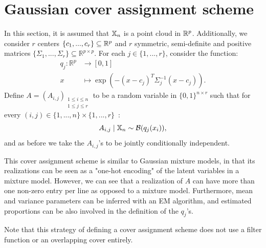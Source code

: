 \section{Gaussian cover assignment scheme}\label{apdx:gaussian}
In this section, it is assumed that  $\mathbb{X}_n$ is a point cloud in $\mathbb{R}^p$. Additionally, we consider $r$ centers $\{c_1,...,c_r\}\subseteq\mathbb{R}^p$ and $r$ symmetric, semi-definite and positive matrices $\{\Sigma_1,...,\Sigma_r\}\subseteq\mathbb{R}^{p\times p}$. For each $j\in\{1,...,r\}$, consider the function:
\begin{align*}
q_j\colon \mathbb{R}^p  &\longrightarrow [0,1]\\
x &\longmapsto \exp \left(-(x-c_j)^T  \Sigma_j^{-1} (x-c_j)\right).
\end{align*}
\noindent
Define $A=(A_{i,j})_{\substack{1\leq i\leq n \\ 1\leq j\leq r}}$ to be a random variable in $\{0,1\}^{n\times r}$ such that for every $(i,j)\in\{1,...,n\}\times\{1,...,r\}$~:
$$ A_{i,j}\mid \mathbb{X}_n\sim \mathcal{B}(q_j(x_i)),$$
and  as before we take the $ A_{i,j}$'s to be jointly conditionally independent.

This cover assignment scheme is similar to Gaussian mixture models, in that its realizations can be seen as a "one-hot encoding" of the latent variables in a mixture model. However, we can see that a realization of $A$ can have more than one non-zero entry per line as opposed to a mixture model. Furthermore, mean and variance parameters can be inferred with an EM algorithm, and estimated proportions can be also involved in the definition  of the $q_j$'s. 

Note that this strategy of defining a cover assignment scheme does not use a filter function or an overlapping cover entirely.

 

